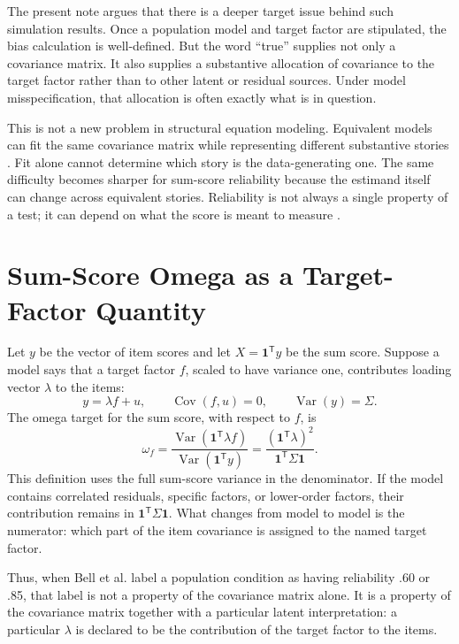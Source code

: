 \documentclass[11pt]{article}
\newcommand{\Var}{\operatorname{Var}}
\newcommand{\Cov}{\operatorname{Cov}}
\newcommand{\T}{^{\mathsf T}}
\newcommand{\one}{\mathbf{1}}
\begin{document}
The present note argues that there is a deeper target issue behind such
simulation results. Once a population model and target factor are stipulated,
the bias calculation is well-defined. But the word ``true'' supplies not only a
covariance matrix. It also supplies a substantive allocation of covariance to
the target factor rather than to other latent or residual sources. Under model
misspecification, that allocation is often exactly what is in question.

This is not a new problem in structural equation modeling. Equivalent models can
fit the same covariance matrix while representing different substantive
stories \cite{bollen1989,maccallum1993}. Fit alone cannot determine which story
is the data-generating one. The same difficulty becomes sharper for sum-score
reliability because the estimand itself can change across equivalent stories.
Reliability is not always a single property of a test; it can depend on what
the score is meant to measure \cite{borsboom2002,ellis2021,savalei2019}.

\section{Sum-Score Omega as a Target-Factor Quantity}

Let \(y\) be the vector of item scores and let \(X=\one\T y\) be the sum score.
Suppose a model says that a target factor \(f\), scaled to have variance one,
contributes loading vector \(\lambda\) to the items:
\[
  y=\lambda f+u,\qquad \Cov(f,u)=0,\qquad \Var(y)=\Sigma .
\]
The omega target for the sum score, with respect to \(f\), is
\begin{equation}\label{eq:omega}
  \omega_f
  =
  \frac{\Var(\one\T\lambda f)}{\Var(\one\T y)}
  =
  \frac{(\one\T\lambda)^2}{\one\T\Sigma\one}.
\end{equation}
This definition uses the full sum-score variance in the denominator. If the
model contains correlated residuals, specific factors, or lower-order factors,
their contribution remains in \(\one\T\Sigma\one\). What changes from model to
model is the numerator: which part of the item covariance is assigned to the
named target factor.

Thus, when Bell et al. label a population condition as having reliability .60 or
.85, that label is not a property of the covariance matrix alone. It is a
property of the covariance matrix together with a particular latent
interpretation: a particular \(\lambda\) is declared to be the contribution of
the target factor to the items.
\end{document}
